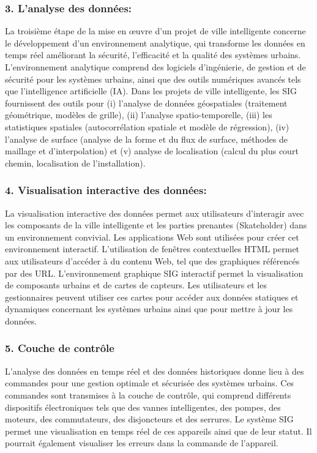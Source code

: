 \documentclass[french, a4paper, 12pt]{report}
\begin{document}
\subsubsection{3. L'analyse des données:}
La troisième étape de la mise en œuvre d'un projet de ville intelligente concerne le développement d'un environnement analytique, qui transforme les données en temps réel améliorant la sécurité, l'efficacité et la qualité des systèmes urbains. L'environnement analytique comprend des logiciels d'ingénierie, de gestion et de sécurité pour les systèmes urbains, ainsi que des outils numériques avancés tels que l'intelligence artificielle (IA). Dans les projets de ville intelligente, les SIG fournissent des outils pour (i) l’analyse de données géospatiales (traitement géométrique, modèles de grille), (ii) l’analyse spatio-temporelle, (iii) les statistiques spatiales (autocorrélation spatiale et modèle de régression), (iv) l’analyse de surface (analyse de la forme et du flux de surface, méthodes de maillage et d'interpolation) et (v) analyse de localisation (calcul du plus court chemin, localisation de l'installation).

\subsubsection{4. Visualisation interactive des données:}
La visualisation interactive des données permet aux utilisateurs d’interagir avec les composants de la ville intelligente et les parties prenantes (Skateholder) dans un environnement convivial. Les applications Web sont utilisées pour créer cet environnement interactif. L'utilisation de fenêtres contextuelles HTML permet aux utilisateurs d'accéder à du contenu Web, tel que des graphiques référencés par des URL. L'environnement graphique SIG interactif permet la visualisation de composants urbains et de cartes de capteurs. Les utilisateurs et les gestionnaires peuvent utiliser ces cartes pour accéder aux données statiques et dynamiques concernant les systèmes urbains ainsi que pour mettre à jour les données.

\subsubsection{5. Couche de contrôle}
L'analyse des données en temps réel et des données historiques donne lieu à des commandes pour une gestion optimale et sécurisée des systèmes urbains. Ces commandes sont transmises à la couche de contrôle, qui comprend différents dispositifs électroniques tels que des vannes intelligentes, des pompes, des moteurs, des commutateurs, des disjoncteurs et des serrures. Le système SIG permet une visualisation en temps réel de ces appareils ainsi que de leur statut. Il pourrait également visualiser les erreurs dans la commande de l'appareil.
\end{document}
